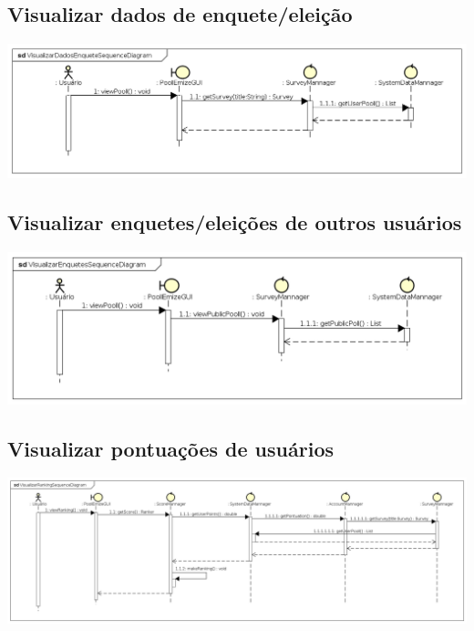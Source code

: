 \documentclass[a4paper,12pt]{report}
\begin{document}
\subsection*{Visualizar dados de enquete/eleição}
\markright{}
\includegraphics[width=14.3cm]{sequence_diagrams/VisualizarDadosEnqueteSequenceDiagram.png}

\subsection*{Visualizar enquetes/eleições de outros usuários}
\markright{}
\includegraphics[width=14.3cm]{sequence_diagrams/VisualizarEnquetesSequenceDiagram.png}

\subsection*{Visualizar pontuações de usuários}
\markright{}
\includegraphics[width=14.3cm]{sequence_diagrams/VisualizarRankingSequenceDiagram.png}
\end{document}
